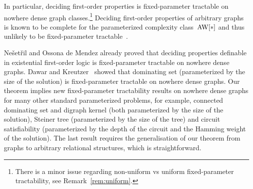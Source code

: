 \documentclass[11pt]{article}
\numberwithin{equation}{section}
\begin{document}
In particular, deciding first-order properties is fixed-parameter
tractable on nowhere dense graph classes.\footnote{There is a minor
  issue regarding non-uniform vs uniform fixed-parameter tractability,
  see Remark~\ref{rem:uniform}.}  Deciding first-order properties of
arbitrary graphs is known to be complete for the parameterized
complexity class~$\textup{AW}[*]$ and thus unlikely to be
fixed-parameter tractable~\cite{dowfeltay96}.

Ne{\v s}et{\v r}il and Ossona de Mendez \cite{NesetrilOdM12} already
proved that deciding properties definable in existential first-order
logic is fixed-parameter tractable on nowhere dense graphs. Dawar and
Kreutzer~\cite{DawarKre09} showed that dominating set (parameterized
by the size of the solution) is fixed-parameter tractable on nowhere
dense graphs. Our theorem implies new fixed-parameter tractability
results on nowhere dense graphs for many other standard parameterized
problems, for example, connected dominating set and digraph kernel
(both parameterized by the size of the solution), Steiner tree
(parameterized by the size of the tree) and circuit satisfiability
(parameterized by the depth of the circuit and the Hamming weight of
the solution). The last result requires the generalisation of our
theorem from graphs to arbitrary relational structures, which is
straightforward.
\end{document}
